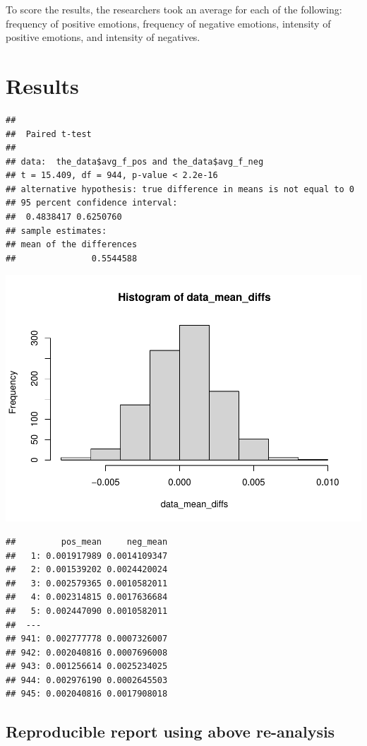 \documentclass[
  english,
  man]{apa6}
\begin{document}
To score the results, the researchers took an average for each of the following: frequency of positive emotions, frequency of negative emotions, intensity of positive emotions, and intensity of negatives.

\hypertarget{results}{%
\section{Results}\label{results}}

\begin{verbatim}
## 
##  Paired t-test
## 
## data:  the_data$avg_f_pos and the_data$avg_f_neg
## t = 15.409, df = 944, p-value < 2.2e-16
## alternative hypothesis: true difference in means is not equal to 0
## 95 percent confidence interval:
##  0.4838417 0.6250760
## sample estimates:
## mean of the differences 
##               0.5544588
\end{verbatim}

\includegraphics{APA_Rep_files/figure-latex/unnamed-chunk-1-1.pdf}

\begin{verbatim}
##         pos_mean     neg_mean
##   1: 0.001917989 0.0014109347
##   2: 0.001539202 0.0024420024
##   3: 0.002579365 0.0010582011
##   4: 0.002314815 0.0017636684
##   5: 0.002447090 0.0010582011
##  ---                         
## 941: 0.002777778 0.0007326007
## 942: 0.002040816 0.0007696008
## 943: 0.001256614 0.0025234025
## 944: 0.002976190 0.0002645503
## 945: 0.002040816 0.0017908018
\end{verbatim}

\hypertarget{reproducible-report-using-above-re-analysis}{%
\subsection{Reproducible report using above re-analysis}\label{reproducible-report-using-above-re-analysis}}
\end{document}

